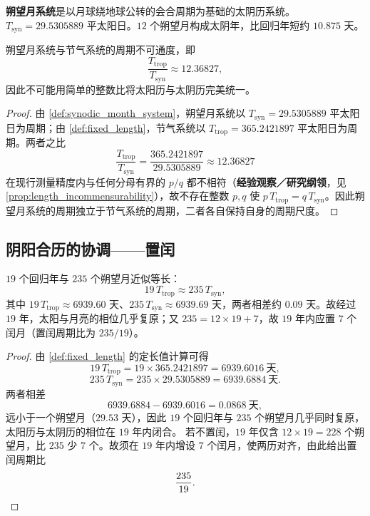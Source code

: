 \begin{definition}[朔望月系统]\label{def:synodic_month_system}
\textbf{朔望月系统}是以月球绕地球公转的会合周期为基础的太阴历系统。\(T_{\text{syn}}=29.5305889\) 平太阳日。\(12\) 个朔望月构成太阴年，比回归年短约 \(10.875\) 天。
\end{definition}

\begin{proposition}[朔望月系统的独立周期]\label{prop:synodic_month_conservation}
朔望月系统与节气系统的周期不可通度，即
\[
\frac{T_{\text{trop}}}{T_{\text{syn}}}\approx 12.36827,
\]
因此不可能用简单的整数比将太阳历与太阴历完美统一。
\end{proposition}

\begin{proof}
由 \cref{def:synodic_month_system}，朔望月系统以 \(T_{\text{syn}}=29.5305889\) 平太阳日为周期；由 \cref{def:fixed_length}，节气系统以 \(T_{\text{trop}}=365.2421897\) 平太阳日为周期。两者之比
\[
\frac{T_{\text{trop}}}{T_{\text{syn}}}=\frac{365.2421897}{29.5305889}\approx 12.36827
\]
在现行测量精度内与任何分母有界的 \(p/q\) 都不相符（\textbf{经验观察／研究纲领}，见 \cref{prop:length_incommensurability}），故不存在整数 \(p,q\) 使 \(p\,T_{\text{trop}}=q\,T_{\text{syn}}\)。因此朔望月系统的周期独立于节气系统的周期，二者各自保持自身的周期尺度。
\end{proof}

\subsection{阴阳合历的协调——置闰}

\begin{lemma}\label{ch18_metonic_cycle}
\(19\) 个回归年与 \(235\) 个朔望月近似等长：
\[
19\,T_{\text{trop}}\approx 235\,T_{\text{syn}},
\]
其中 \(19\,T_{\text{trop}}\approx 6939.60\) 天、\(235\,T_{\text{syn}}\approx 6939.69\) 天，两者相差约 \(0.09\) 天。故经过 \(19\) 年，太阳与月亮的相位几乎复原；又 \(235=12\times 19+7\)，故 \(19\) 年内应置 \(7\) 个闰月（置闰周期比为 \(235/19\)）。
\end{lemma}

\begin{proof}
由 \cref{def:fixed_length} 的定长值计算可得
\[
19\,T_{\text{trop}}=19\times 365.2421897=6939.6016\ \text{天},
\]
\[
235\,T_{\text{syn}}=235\times 29.5305889=6939.6884\ \text{天}.
\]
两者相差
\[
6939.6884-6939.6016=0.0868\ \text{天},
\]
远小于一个朔望月（\(29.53\) 天），因此 \(19\) 个回归年与 \(235\) 个朔望月几乎同时复原，太阳历与太阴历的相位在 \(19\) 年内闭合。
若不置闰，\(19\) 年仅含 \(12\times 19=228\) 个朔望月，比 \(235\) 少 \(7\) 个。故须在 \(19\) 年内增设 \(7\) 个闰月，使两历对齐，由此给出置闰周期比
\[
\frac{235}{19}.
\qedhere
\]
\end{proof}

